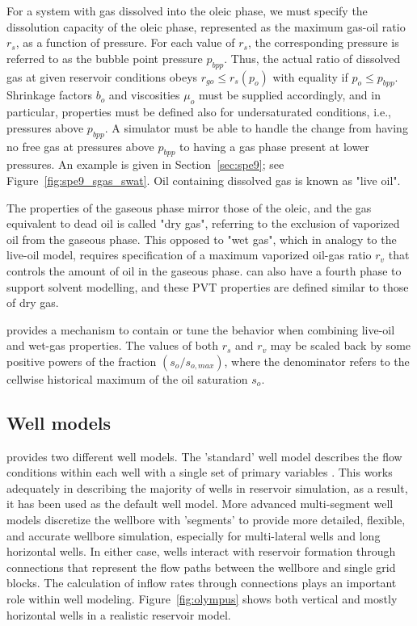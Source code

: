 For a system with gas dissolved into the oleic phase, we must specify the dissolution capacity
of the oleic phase, represented as the maximum gas-oil ratio $r_s$, as a function of pressure. 
For each value of $r_s$, the corresponding pressure is referred to as the bubble point pressure $p_{bpp}$.
Thus, the actual ratio of dissolved gas at given reservoir conditions
obeys $r_{go}\leq r_s(p_o)$ with equality if $p_o\leq p_{bpp}$.
Shrinkage factors $b_o$ and viscosities $\mu_o$ must be supplied accordingly, and in particular, 
properties must be defined also for undersaturated conditions,
i.e., pressures above $p_{bpp}$. A simulator must be able to handle
the change from having no free gas at pressures above $p_{bpp}$ to
having a gas phase present at lower pressures. An example is given in
Section~\ref{sec:spe9}; see Figure~\ref{fig:spe9_sgas_swat}.
Oil containing dissolved gas is known as "live oil".

The properties of the gaseous phase mirror those of the oleic, and the gas equivalent to dead oil 
is called "dry gas", referring to the exclusion of vaporized oil from the gaseous phase.
This opposed to "wet gas", which in analogy to the live-oil model, requires specification 
of a maximum vaporized oil-gas ratio $r_v$ that controls the amount of oil in the gaseous phase.
\opmflow can also have a fourth phase to support solvent modelling, and these PVT properties
are defined similar to those of dry gas.

\opmflow provides a mechanism to contain or tune the behavior when combining live-oil and wet-gas properties.
The values of both $r_s$ and $r_v$ may be scaled back by some positive powers of the fraction $(s_o/s_{o,max})$, 
where the denominator refers to the cellwise historical maximum of the oil saturation $s_o$.


\subsection{Well models}\label{sec:wellmodels}

\opm provides two different well models. The 'standard' well model describes the flow
conditions within each well with a single set of primary variables
\citep{holmes1983enhancements}. This works adequately in describing the majority of wells
in reservoir simulation, as a result, it has been used as the default well model. More
advanced multi-segment well models \citep{holmes1998application} discretize the wellbore
with 'segments' to provide more detailed, flexible, and accurate wellbore simulation,
especially for multi-lateral wells and long horizontal wells. In either case, wells
interact with reservoir formation through connections that represent the flow paths
between the wellbore and single grid blocks. The calculation of inflow rates through
connections plays an important role within well modeling. Figure~\ref{fig:olympus} shows
both vertical and mostly horizontal wells in a realistic reservoir model.


